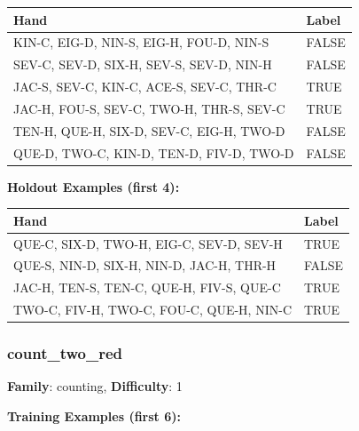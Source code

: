 \documentclass[10pt,a4paper]{article}
\begin{document}
\begin{small}
\begin{tabular}{p{8cm}l}
\toprule
Hand & Label \\
\midrule
KIN-C, EIG-D, NIN-S, EIG-H, FOU-D, NIN-S & \textcolor{negative}{FALSE} \\
SEV-C, SEV-D, SIX-H, SEV-S, SEV-D, NIN-H & \textcolor{negative}{FALSE} \\
JAC-S, SEV-C, KIN-C, ACE-S, SEV-C, THR-C & \textcolor{positive}{TRUE} \\
JAC-H, FOU-S, SEV-C, TWO-H, THR-S, SEV-C & \textcolor{positive}{TRUE} \\
TEN-H, QUE-H, SIX-D, SEV-C, EIG-H, TWO-D & \textcolor{negative}{FALSE} \\
QUE-D, TWO-C, KIN-D, TEN-D, FIV-D, TWO-D & \textcolor{negative}{FALSE} \\
\bottomrule
\end{tabular}
\end{small}

\textbf{Holdout Examples (first 4):}

\begin{small}
\begin{tabular}{p{8cm}l}
\toprule
Hand & Label \\
\midrule
QUE-C, SIX-D, TWO-H, EIG-C, SEV-D, SEV-H & \textcolor{positive}{TRUE} \\
QUE-S, NIN-D, SIX-H, NIN-D, JAC-H, THR-H & \textcolor{negative}{FALSE} \\
JAC-H, TEN-S, TEN-C, QUE-H, FIV-S, QUE-C & \textcolor{positive}{TRUE} \\
TWO-C, FIV-H, TWO-C, FOU-C, QUE-H, NIN-C & \textcolor{positive}{TRUE} \\
\bottomrule
\end{tabular}
\end{small}

\vspace{0.5cm}

\subsubsection{count\_two\_red}

\textbf{Family}: counting, \textbf{Difficulty}: 1

\textbf{Training Examples (first 6):}
\end{document}
